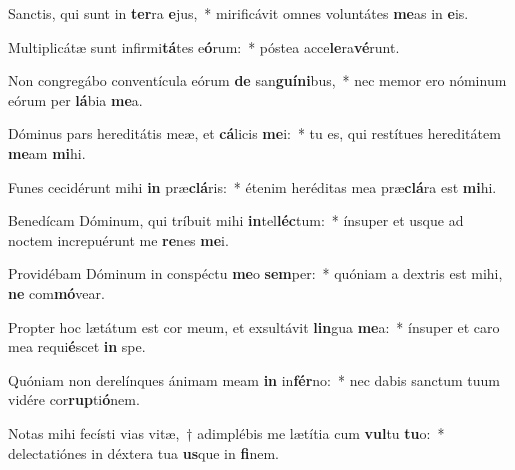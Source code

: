 \item Sanctis, qui sunt in \textbf{ter}ra \textbf{e}jus,~* mirificávit omnes voluntátes \textbf{me}as in \textbf{e}is.
\item Multiplicátæ sunt infirmi\textbf{tá}tes e\textbf{ó}rum:~* póstea acce\textbf{le}ra\textbf{vé}runt.
\item Non congregábo conventícula eórum \textbf{de} san\textbf{guí}\textbf{ni}bus,~* nec memor ero nóminum eórum per \textbf{lá}bia \textbf{me}a.
\item Dóminus pars hereditátis meæ, et \textbf{cá}licis \textbf{me}i:~* tu es, qui restítues hereditátem \textbf{me}am \textbf{mi}hi.
\item Funes cecidérunt mihi \textbf{in} præ\textbf{clá}ris:~* étenim heréditas mea præ\textbf{clá}ra est \textbf{mi}hi.
\item Benedícam Dóminum, qui tríbuit mihi \textbf{in}tel\textbf{léc}tum:~* ínsuper et usque ad noctem increpuérunt me \textbf{re}nes \textbf{me}i.
\item Providébam Dóminum in conspéctu \textbf{me}o \textbf{sem}per:~* quóniam a dextris est mihi, \textbf{ne} com\textbf{mó}vear.
\item Propter hoc lætátum est cor meum, et exsultávit \textbf{lin}gua \textbf{me}a:~* ínsuper et caro mea requi\textbf{é}scet \textbf{in} spe.
\item Quóniam non derelínques ánimam meam \textbf{in} in\textbf{fér}no:~* nec dabis sanctum tuum vidére cor\textbf{rup}ti\textbf{ó}nem.
\item Notas mihi fecísti vias vitæ,~† adimplébis me lætítia cum \textbf{vul}tu \textbf{tu}o:~* delectatiónes in déxtera tua \textbf{us}que in \textbf{fi}nem.
